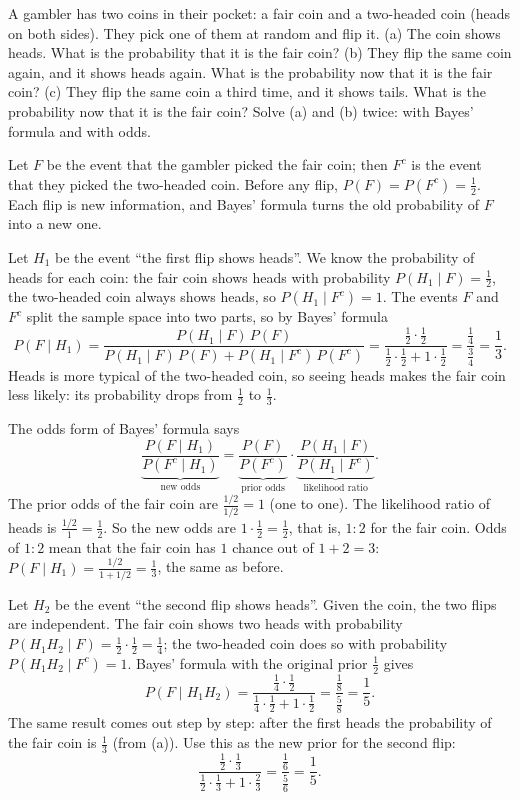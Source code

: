 
\begin{problem}
	A gambler has two coins in their pocket: a fair coin and a two-headed coin
	(heads on both sides). They pick one of them at random and flip it.
	(a) The coin shows heads. What is the probability that it is the fair
	coin? (b) They flip the same coin again, and it shows heads again. What is
	the probability now that it is the fair coin? (c) They flip the same coin a
	third time, and it shows tails. What is the probability now that it is the
	fair coin? Solve (a) and (b) twice: with Bayes' formula and with odds.
\end{problem}

\begin{solution}
	\idea Let $F$ be the event that the gambler picked the fair coin; then $F^c$ is the
	event that they picked the two-headed coin. Before any flip,
	$P(F)=P(F^c)=\frac12$. Each flip is new information, and Bayes' formula
	turns the old probability of $F$ into a new one.

	 Let $H_1$ be the event ``the first flip shows
	heads''. We know the probability of heads for each coin: the fair coin
	shows heads with probability $P(H_1\mid F)=\frac12$, the two-headed coin
	always shows heads, so $P(H_1\mid F^c)=1$. The events $F$ and $F^c$ split
	the sample space into two parts, so by Bayes' formula
	\[
		P(F\mid H_1)
		=\frac{P(H_1\mid F)\,P(F)}{P(H_1\mid F)\,P(F)+P(H_1\mid F^c)\,P(F^c)}
		=\frac{\frac12\cdot\frac12}{\frac12\cdot\frac12+1\cdot\frac12}
		=\frac{\frac14}{\frac34}
		=\frac13.
	\]
	Heads is more typical of the two-headed coin, so seeing heads makes the
	fair coin less likely: its probability drops from $\frac12$ to $\frac13$.

	 The odds form of Bayes' formula says
	\[
		\underbrace{\frac{P(F\mid H_1)}{P(F^c\mid H_1)}}_{\text{new odds}}
		=\underbrace{\frac{P(F)}{P(F^c)}}_{\text{prior odds}}\cdot
		\underbrace{\frac{P(H_1\mid F)}{P(H_1\mid F^c)}}_{\text{likelihood ratio}}.
	\]
	The prior odds of the fair coin are $\frac{1/2}{1/2}=1$ (one to one). The
	likelihood ratio of heads is $\frac{1/2}{1}=\frac12$. So the new odds are
	$1\cdot\frac12=\frac12$, that is, $1:2$ for the fair coin. Odds of $1:2$
	mean that the fair coin has $1$ chance out of $1+2=3$:
	$P(F\mid H_1)=\frac{1/2}{1+1/2}=\frac13$, the same as before.

	 Let $H_2$ be the event ``the second flip shows
	heads''. Given the coin, the two flips are independent. The fair coin shows
	two heads with probability $P(H_1H_2\mid F)=\frac12\cdot\frac12=\frac14$;
	the two-headed coin does so with probability $P(H_1H_2\mid F^c)=1$. Bayes'
	formula with the original prior $\frac12$ gives
	\[
		P(F\mid H_1H_2)
		=\frac{\frac14\cdot\frac12}{\frac14\cdot\frac12+1\cdot\frac12}
		=\frac{\frac18}{\frac58}
		=\frac15.
	\]
	The same result comes out step by step: after the first heads the
	probability of the fair coin is $\frac13$ (from (a)). Use this as the new
	prior for the second flip:
	\[
		\frac{\frac12\cdot\frac13}{\frac12\cdot\frac13+1\cdot\frac23}
		=\frac{\frac16}{\frac56}
		=\frac15.
	\]


\end{solution}
